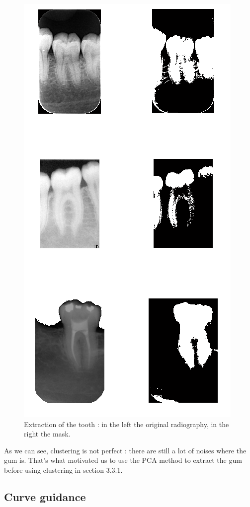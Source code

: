\begin{figure}[H]
\centering
\includegraphics[scale=0.6]{images/clusterRun.png}
\caption{Extraction of the tooth : in the left the original radiography, in the right the mask.}
\label{cluster}
\end{figure}

As we can see, clustering is not perfect : there are still a lot of noises where the gum is. That's what motivated us to use the PCA method to extract the gum before using clustering in section 3.3.1.
\subsection{Curve guidance}

